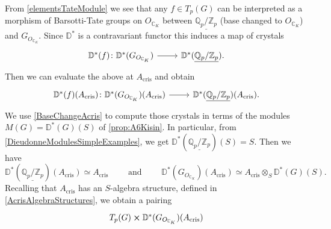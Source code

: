 \begin{rem}[]\label{constr:ComparisonMorphism}
	From \cref{elementsTateModule} we see that any $f \in T_p(G)$
	can be interpreted as a morphism of Barsotti-Tate groups
	on $O_{\mathbb{C}_K}$ between $\underline{\mathbb{Q}_p/\mathbb{Z}_{p}}$
	(base changed to $O_{\mathbb{C}_K}$) and $G_{O_{\mathbb{C}_K}}$.
	Since $\mathbb{D}^*$ is a contravariant functor this induces a map
	of crystals
	\begin{equation*}
	\begin{tikzcd}[row sep = 0ex
		,/tikz/column 1/.append style={anchor=base east}
		,/tikz/column 2/.append style={anchor=base west}]
		\mathbb{D}^*(f)\colon 
		\mathbb{D}^*(G_{O_{\mathbb{C}_K}})\arrow[r, "", rightarrow] &
		\mathbb{D}^*(\underline{\mathbb{Q}_p/\mathbb{Z}_{p}})
	.\end{tikzcd}
	\end{equation*} 
	Then we can evaluate the above at $A_{\mathrm{cris}}$ and obtain
	\begin{equation*}
	\begin{tikzcd}[row sep = 0ex
		,/tikz/column 1/.append style={anchor=base east}
		,/tikz/column 2/.append style={anchor=base west}]
		\mathbb{D}^*(f)(A_{\mathrm{cris}})\colon 
		\mathbb{D}^*(G_{O_{\mathbb{C}_K}})(A_{\mathrm{cris}})
		\arrow[r, "", rightarrow] &
		\mathbb{D}^*(\underline{\mathbb{Q}_p/\mathbb{Z}_{p}})(A_{\mathrm{cris}})
	.\end{tikzcd}
	\end{equation*} 
	We use \cref{BaseChangeAcris} to compute those crystals
	in terms of the modules $M(G) = \mathbb{D}^*(G)(S)$ of \cref{prop:A6Kisin}.
	In particular, from \cref{DieudonneModulesSimpleExamples}, we get
	$\mathbb{D}^*(\underline{\mathbb{Q}_p/\mathbb{Z}_{p}})(S) = S$.
	Then we have
	\begin{equation*}
	\mathbb{D}^*(\underline{\mathbb{Q}_p/\mathbb{Z}_{p}})(A_{\mathrm{cris}})
	\simeq A_{\mathrm{cris}}
	\qquad \text{ and } \qquad
	\mathbb{D}^*(G_{O_{\mathbb{C}_K}})(A_{\mathrm{cris}}) \simeq
	A_{\mathrm{cris}} \otimes_S \mathbb{D}^*(G)(S)
	.\end{equation*}
	Recalling that $A_{\mathrm{cris}}$ has an $S$-algebra structure,
	defined in \cref{AcrisAlgebraStructures}, we obtain a pairing
	\begin{equation*}
	\begin{tikzcd}[row sep = 0ex
		,/tikz/column 1/.append style={anchor=base east}
		,/tikz/column 2/.append style={anchor=base west}]
		T_p(G) \cross \mathbb{D}^*(G_{O_{\mathbb{C}_K}})(A_{\mathrm{cris}}) 

\end{tikzcd}
\end{equation*}
\end{rem}
